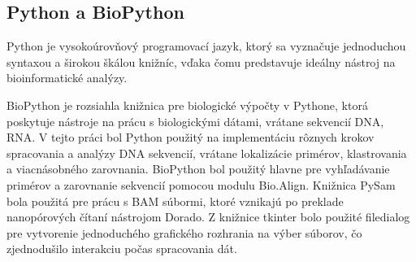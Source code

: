 
\subsection{Python a BioPython}
Python je vysokoúrovňový programovací jazyk, ktorý sa vyznačuje jednoduchou syntaxou a širokou škálou knižníc, vďaka čomu predstavuje ideálny nástroj na bioinformatické analýzy.

BioPython je rozsiahla knižnica pre biologické výpočty v Pythone, ktorá poskytuje nástroje na prácu s biologickými dátami, vrátane sekvencií DNA, RNA.
V tejto práci bol Python použitý na implementáciu rôznych krokov spracovania a analýzy DNA sekvencií, vrátane lokalizácie primérov, klastrovania a viacnásobného zarovnania.
BioPython bol použitý hlavne pre vyhľadávanie primérov a zarovnanie sekvencií pomocou modulu Bio.Align.
Knižnica PySam bola použitá pre prácu s BAM súbormi, ktoré vznikajú po preklade nanopórových čítaní nástrojom Dorado.
Z knižnice tkinter bolo použité filedialog pre vytvorenie jednoduchého grafického rozhrania na výber súborov, čo zjednodušilo interakciu počas spracovania dát.

